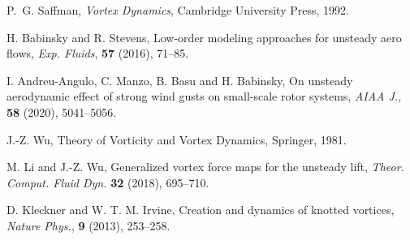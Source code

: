 \documentclass[11pt]{article}
\begin{document}
\begin{thebibliography}{99}

P.~G. Saffman,
\textit{Vortex Dynamics},
Cambridge University Press, 1992.

H. Babinsky and R. Stevens,
Low-order modeling approaches for unsteady aero flows,
\textit{Exp. Fluids}, \textbf{57} (2016), 71--85.

I. Andreu-Angulo, C. Manzo, B. Basu and H. Babinsky,
On unsteady aerodynamic effect of strong wind gusts on small-scale rotor systems,
\textit{AIAA J.}, \textbf{58} (2020), 5041--5056.

J.-Z. Wu,
Theory of Vorticity and Vortex Dynamics,
Springer, 1981.

M. Li and J.-Z. Wu,
Generalized vortex force maps for the unsteady lift,
\textit{Theor. Comput. Fluid Dyn.} \textbf{32} (2018), 695--710.

D. Kleckner and W. T. M. Irvine,
Creation and dynamics of knotted vortices,
\textit{Nature Phys.}, \textbf{9} (2013), 253--258.

\end{thebibliography}
\end{document}
